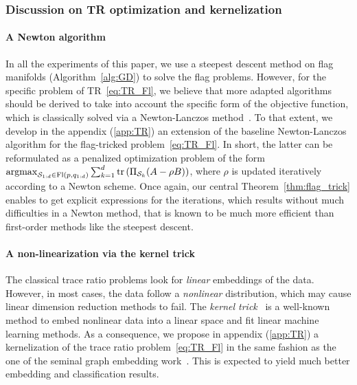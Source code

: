 \subsubsection{Discussion on TR optimization and kernelization}
\paragraph{A Newton algorithm}
In all the experiments of this paper, we use a steepest descent method on flag manifolds (Algorithm~\ref{alg:GD}) to solve the flag problems.
However, for the specific problem of TR~\eqref{eq:TR_Fl}, we believe that more adapted algorithms should be derived to take into account the specific form of the objective function, which is classically solved via a Newton-Lanczos method~\citep{ngo_trace_2012}. 
To that extent, we develop in the appendix (\autoref{app:TR}) an extension of the baseline Newton-Lanczos algorithm for the flag-tricked problem~\eqref{eq:TR_Fl}.
In short, the latter can be reformulated as a penalized optimization problem of the form $\operatorname{argmax}_{\mathcal{S}_{1:d}\in\operatorname{Fl}(p, q_{1:d})} {\sum_{k=1}^d \operatorname{tr}\left(\Pi_{\mathcal{S}_k} (A - \rho B)\right)}$, where $\rho$ is updated iteratively according to a Newton scheme. Once again, our central Theorem~\ref{thm:flag_trick} enables to get explicit expressions for the iterations, which results without much difficulties in a Newton method, that is known to be much more efficient than first-order methods like the steepest descent.

\paragraph{A non-linearization via the kernel trick}
The classical trace ratio problems look for \textit{linear} embeddings of the data.
However, in most cases, the data follow a \textit{nonlinear} distribution, which may cause linear dimension reduction methods to fail. The \textit{kernel trick}~\citep{hofmann_kernel_2008} is a well-known method to embed nonlinear data into a linear space and fit linear machine learning methods.
As a consequence, we propose in appendix (\autoref{app:TR}) a kernelization of the trace ratio problem~\eqref{eq:TR_Fl} in the same fashion as the one of the seminal graph embedding work~\citep{yan_graph_2007}.
This is expected to yield much better embedding and classification results.